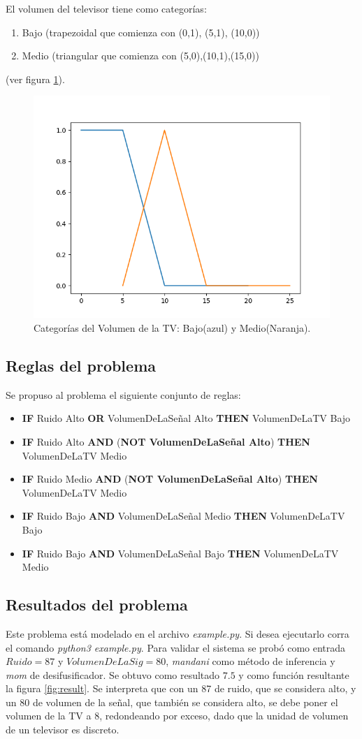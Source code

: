 \documentclass[11pt]{article}
\begin{document}
El volumen del televisor tiene como categor\'ias:
\begin{enumerate}
	\item Bajo (trapezoidal que comienza con (0,1), (5,1), (10,0))
	\item Medio (triangular que comienza con (5,0),(10,1),(15,0))
\end{enumerate}
(ver figura \ref{fig:volTV}).
\begin{figure}[ht]
	\centering
	\includegraphics[width=.5\textwidth]{images/VolumenDeLaTV.png}			
	\caption{Categor\'ias del Volumen de la TV:  Bajo(azul) y Medio(Naranja).}
	\label{fig:volTV}	
\end{figure}

 \subsection{Reglas del problema}
Se propuso al problema el siguiente conjunto de reglas:
\begin{itemize}
	\item \textbf{IF} Ruido Alto \textbf{OR} VolumenDeLaSe\~nal Alto \textbf{THEN} VolumenDeLaTV Bajo
	\item \textbf{IF} Ruido Alto \textbf{AND} (\textbf{NOT VolumenDeLaSe\~nal Alto}) \textbf{THEN} VolumenDeLaTV Medio
	\item \textbf{IF} Ruido Medio \textbf{AND} (\textbf{NOT VolumenDeLaSe\~nal Alto}) \textbf{THEN} VolumenDeLaTV Medio
	\item \textbf{IF} Ruido Bajo \textbf{AND} VolumenDeLaSe\~nal Medio \textbf{THEN} VolumenDeLaTV Bajo
	\item \textbf{IF} Ruido Bajo \textbf{AND} VolumenDeLaSe\~nal Bajo \textbf{THEN} VolumenDeLaTV Medio
	
\end{itemize}

\subsection{Resultados del problema}
Este problema est\'a modelado en el archivo \emph{example.py}. Si desea ejecutarlo corra el comando \emph{python3 example.py}. 
Para validar el sistema se prob\'o como entrada $Ruido=87$ y $VolumenDeLaSig=80$, \emph{mandani} como m\'etodo de inferencia y \emph{mom} de desifusificador. Se obtuvo como resultado $7.5$ y como funci\'on resultante la figura \ref{fig:result}. Se interpreta que con un 87 de ruido, que se considera alto, y un 80 de volumen de la se\~nal, que tambi\'en se considera alto, se debe poner el volumen de la TV a 8, redondeando por exceso, dado que la unidad de volumen de un televisor es discreto.
\end{document}

